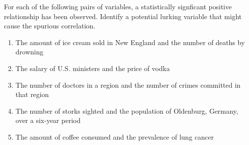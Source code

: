 \documentclass[10pt]{article}
\begin{document}
For each of the following pairs of variables, a statistically signficant positive relationship has been observed. Identify a potential lurking variable that might cause the spurious correlation.
\begin{enumerate}
  \itemsep0.5in
  \item The amount of ice cream sold in New England and the number of deaths by drowning
  \item The salary of U.S. ministers and the price of vodka
  \item The number of doctors in a region and the number of crimes committed in that region
  \item The number of storks sighted and the population of Oldenburg, Germany, over a six-year period
  \item The amount of coffee consumed and the prevalence of lung cancer
\end{enumerate}
\end{document}
